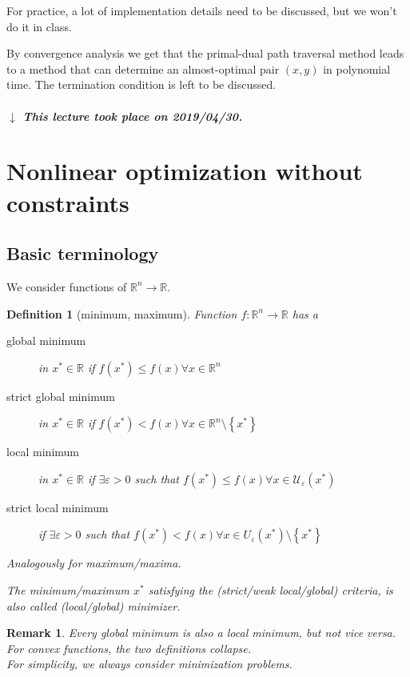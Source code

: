 \documentclass[a4paper]{article}
\newcounter{lecref}[subsection]
\numberwithin{lecref}{subsection}
\newtheorem{definition}[lecref]{Definition}
\newtheorem*{Remark}{Remark}
\newcommand{\Set}[1]{\left\{#1\right\}}
\newcommand{\dateref}[1]{%
  \begin{mdframed}[backgroundcolor=gray!10,innerbottommargin=0pt,innertopmargin=0pt]
    \paragraph{\textit{$\downarrow$ This lecture took place on #1.}}%
  \end{mdframed}%
}
\begin{document}
For practice, a lot of implementation details need to be discussed, but we won't do it in class.

By convergence analysis we get that the primal-dual path traversal method leads to a method that can determine an almost-optimal pair $(x, y)$ in polynomial time. The termination condition is left to be discussed.

\dateref{2019/04/30}

\section{Nonlinear optimization without constraints}
\subsection{Basic terminology}

We consider functions of $\mathbb R^n \to \mathbb R$.

\begin{definition}[minimum, maximum]
	Function $f: \mathbb R^n \to \mathbb R$ has a
	\begin{description}
		\item[global minimum] in $x^* \in \mathbb R$ if $f(x^*) \leq f(x) \forall x \in \mathbb R^n$
		\item[strict global minimum] in $x^* \in \mathbb R$ if $f(x^*) < f(x) \forall x \in \mathbb R^n \setminus \Set{x^*}$
		\item[local minimum] in $x^* \in \mathbb R$ if $\exists \varepsilon > 0$ such that $f(x^*) \leq f(x) \forall x \in \mathcal U_\varepsilon(x^*)$
		\item[strict local minimum] if $\exists \varepsilon > 0$ such that $f(x^*) < f(x) \forall x \in U_\varepsilon(x^*) \setminus \Set{x^*}$
	\end{description}
	Analogously for maximum/maxima.

	The minimum/maximum $x^*$ satisfying the (strict/weak local/global) criteria, is also called (local/global) \emph{minimizer}.
\end{definition}

\begin{Remark}
	Every global minimum is also a local minimum, but not vice versa. \\
	For convex functions, the two definitions collapse. \\
	For simplicity, we always consider minimization problems.
\end{Remark}
\end{document}
